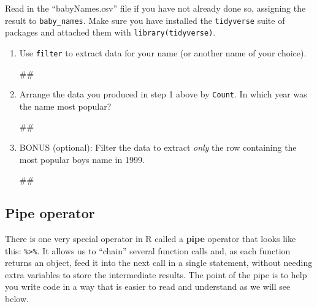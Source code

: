\documentclass[]{book}
\newenvironment{Shaded}{\begin{snugshade}}{\end{snugshade}}
\newcommand{\NormalTok}[1]{#1}
\begin{document}
Read in the ``babyNames.csv'' file if you have not already done so,
assigning the result to \texttt{baby\_names}. Make sure you have
installed the \texttt{tidyverse} suite of packages and attached them
with \texttt{library(tidyverse)}.

\begin{enumerate}
\def\labelenumi{\arabic{enumi}.}
\item
  Use \texttt{filter} to extract data for your name (or another name of
  your choice).

\begin{Shaded}
\begin{Highlighting}[]
\NormalTok{##}
\end{Highlighting}
\end{Shaded}
\item
  Arrange the data you produced in step 1 above by \texttt{Count}. In
  which year was the name most popular?

\begin{Shaded}
\begin{Highlighting}[]
\NormalTok{##}
\end{Highlighting}
\end{Shaded}
\item
  BONUS (optional): Filter the data to extract \emph{only} the row
  containing the most popular boys name in 1999.

\begin{Shaded}
\begin{Highlighting}[]
\NormalTok{##}
\end{Highlighting}
\end{Shaded}
\end{enumerate}

\subsection{Pipe operator}\label{pipe-operator}

There is one very special operator in R called a \textbf{pipe} operator
that looks like this: \texttt{\%\textgreater{}\%}. It allows us to
``chain'' several function calls and, as each function returns an
object, feed it into the next call in a single statement, without
needing extra variables to store the intermediate results. The point of
the pipe is to help you write code in a way that is easier to read and
understand as we will see below.
\end{document}
